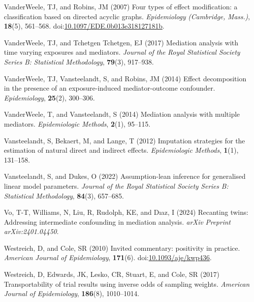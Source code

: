 \documentclass[
  single column]{article}
\newlength{\cslhangindent}
\newenvironment{CSLReferences}[2] %
 {\begin{list}{}{%
  \setlength{\itemindent}{0pt}
  \setlength{\leftmargin}{0pt}
  \setlength{\parsep}{0pt}
  \ifodd #1
   \setlength{\leftmargin}{\cslhangindent}
   \setlength{\itemindent}{-1\cslhangindent}
  \fi
  \setlength{\itemsep}{#2\baselineskip}}}
 {\end{list}}
\begin{document}
\begin{CSLReferences}{1}{0}
VanderWeele, TJ, and Robins, JM (2007) Four types of effect
modification: a classification based on directed acyclic graphs.
\emph{Epidemiology (Cambridge, Mass.)}, \textbf{18}(5), 561--568.
doi:\href{https://doi.org/10.1097/EDE.0b013e318127181b}{10.1097/EDE.0b013e318127181b}.

VanderWeele, TJ, and Tchetgen Tchetgen, EJ (2017) Mediation analysis
with time varying exposures and mediators. \emph{Journal of the Royal
Statistical Society Series B: Statistical Methodology}, \textbf{79}(3),
917--938.

VanderWeele, TJ, Vansteelandt, S, and Robins, JM (2014) Effect
decomposition in the presence of an exposure-induced mediator-outcome
confounder. \emph{Epidemiology}, \textbf{25}(2), 300--306.

VanderWeele, T, and Vansteelandt, S (2014) Mediation analysis with
multiple mediators. \emph{Epidemiologic Methods}, \textbf{2}(1),
95--115.

Vansteelandt, S, Bekaert, M, and Lange, T (2012) Imputation strategies
for the estimation of natural direct and indirect effects.
\emph{Epidemiologic Methods}, \textbf{1}(1), 131--158.

Vansteelandt, S, and Dukes, O (2022) Assumption-lean inference for
generalised linear model parameters. \emph{Journal of the Royal
Statistical Society Series B: Statistical Methodology}, \textbf{84}(3),
657--685.

Vo, T-T, Williams, N, Liu, R, Rudolph, KE, and Dıaz, I (2024) Recanting
twins: Addressing intermediate confounding in mediation analysis.
\emph{arXiv Preprint arXiv:2401.04450}.

Westreich, D, and Cole, SR (2010) Invited commentary: positivity in
practice. \emph{American Journal of Epidemiology}, \textbf{171}(6).
doi:\href{https://doi.org/10.1093/aje/kwp436}{10.1093/aje/kwp436}.

Westreich, D, Edwards, JK, Lesko, CR, Stuart, E, and Cole, SR (2017)
Transportability of trial results using inverse odds of sampling
weights. \emph{American Journal of Epidemiology}, \textbf{186}(8),
1010--1014.


\end{CSLReferences}
\end{document}
